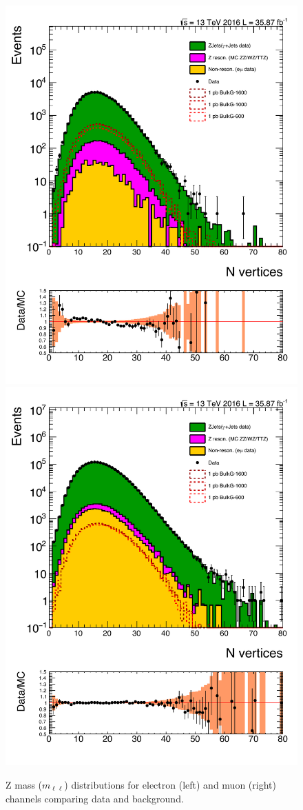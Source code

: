 \begin{figure}[htbp!]
\centering
\includegraphics[width=0.46\linewidth,page=8]{figures/ReMiniSummer16_DT_PhReMiniMCRcFixXsec_GMCPhPtWt_tightzpt50_puWeightsummer16_muoneg_gjet_metfilter_unblind_el_log_1pb.pdf}
\includegraphics[width=0.46\linewidth,page=8]{figures/ReMiniSummer16_DT_PhReMiniMCRcFixXsec_GMCPhPtWt_tightzpt50_puWeightsummer16_muoneg_gjet_metfilter_unblind_mu_log_1pb.pdf}
\caption{Z mass ($m_{\ell\ell}$) distributions for electron (left) and muon (right) channels
comparing data and background.}
\label{fig:gjet_mz}
\end{figure}

